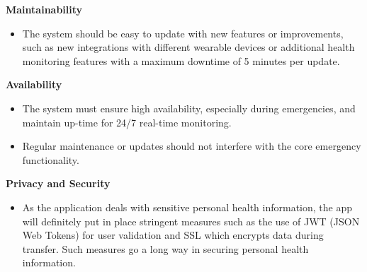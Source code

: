 \textbf{Maintainability}
    \begin{itemize}
        \item The system should be easy to update with new features or improvements, such as new integrations with different wearable devices or additional health monitoring features with a maximum downtime of 5 minutes per update.
    \end{itemize}
\textbf{Availability}
    \begin{itemize}
        \item  The system must ensure high availability, especially during emergencies, and maintain up-time for 24/7 real-time monitoring.
        \item  Regular maintenance or updates should not interfere with the core emergency functionality.
    \end{itemize}
\textbf{ Privacy and Security}
    \begin{itemize}
        \item As the application deals with sensitive personal health information, the app will definitely put in place stringent measures such as the use of JWT (JSON Web Tokens) for user validation and SSL which encrypts data during transfer. Such measures go a long way in securing personal health information.
    \end{itemize}
